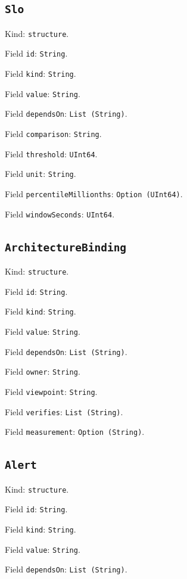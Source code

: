 \documentclass[11pt]{article}
\begin{document}
\subsection*{\texttt{Slo}}
\noindent Kind: \texttt{structure}.\par
\noindent Field \texttt{id}: \texttt{String}.\par
\noindent Field \texttt{kind}: \texttt{String}.\par
\noindent Field \texttt{value}: \texttt{String}.\par
\noindent Field \texttt{dependsOn}: \texttt{List (String)}.\par
\noindent Field \texttt{comparison}: \texttt{String}.\par
\noindent Field \texttt{threshold}: \texttt{UInt64}.\par
\noindent Field \texttt{unit}: \texttt{String}.\par
\noindent Field \texttt{percentileMillionths}: \texttt{Option (UInt64)}.\par
\noindent Field \texttt{windowSeconds}: \texttt{UInt64}.\par
\subsection*{\texttt{ArchitectureBinding}}
\noindent Kind: \texttt{structure}.\par
\noindent Field \texttt{id}: \texttt{String}.\par
\noindent Field \texttt{kind}: \texttt{String}.\par
\noindent Field \texttt{value}: \texttt{String}.\par
\noindent Field \texttt{dependsOn}: \texttt{List (String)}.\par
\noindent Field \texttt{owner}: \texttt{String}.\par
\noindent Field \texttt{viewpoint}: \texttt{String}.\par
\noindent Field \texttt{verifies}: \texttt{List (String)}.\par
\noindent Field \texttt{measurement}: \texttt{Option (String)}.\par
\subsection*{\texttt{Alert}}
\noindent Kind: \texttt{structure}.\par
\noindent Field \texttt{id}: \texttt{String}.\par
\noindent Field \texttt{kind}: \texttt{String}.\par
\noindent Field \texttt{value}: \texttt{String}.\par
\noindent Field \texttt{dependsOn}: \texttt{List (String)}.\par
\end{document}
